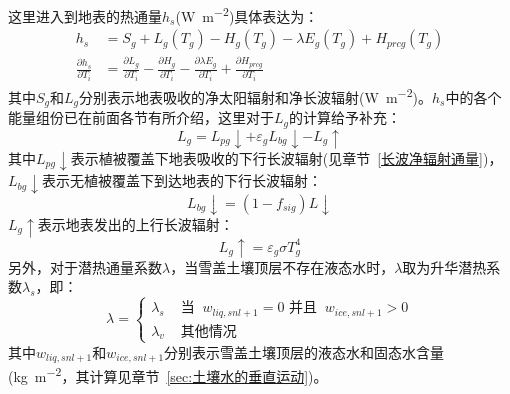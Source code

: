 这里进入到地表的热通量$h_s$(\unit{W.m^{-2}})具体表达为：
\begin{equation}
\begin{aligned}
h_{s} &= S_{g}+L_{g}\left(T_{g}\right)-H_{g}\left(T_{g}\right)-\lambda E_{g}\left(T_{g}\right)+H_{p r c g}\left(T_{g}\right) \\
\frac{\partial h_{s}}{\partial T_{i}} &= \frac{\partial L_{g}}{\partial T_{i}}-\frac{\partial H_{g}}{\partial T_{i}}-\frac{\partial \lambda E_{g}}{\partial T_{i}}+\frac{\partial H_{p r c g}}{\partial T_{i}}
\end{aligned}
\end{equation}
其中$S_g$和$L_g$分别表示地表吸收的净太阳辐射和净长波辐射(\unit{W.m^{-2}})。$h_s$中的各个能量组份已在前面各节有所介绍，这里对于$L_g$的计算给予补充：
\begin{equation}
L_{g}=L_{p g} \downarrow+\varepsilon_{g} L_{b g} \downarrow-L_{g} \uparrow
\end{equation}
其中$L_{pg}\downarrow$表示植被覆盖下地表吸收的下行长波辐射(见章节~\ref{长波净辐射通量})，$L_{bg}\downarrow$表示无植被覆盖下到达地表的下行长波辐射：
\begin{equation}
L_{b g} \downarrow=\left(1-f_{ sig }\right) L \downarrow
\end{equation}
$L_g\uparrow$表示地表发出的上行长波辐射：
\begin{equation}
L_{g} \uparrow=\varepsilon_{g} \sigma T_{g}^{4}
\end{equation}
另外，对于潜热通量系数$\lambda$，当雪盖土壤顶层不存在液态水时，$\lambda$取为升华潜热系数$\lambda_s$，即：
\begin{equation}
\lambda=\left\{\begin{array}{lr}\lambda_{s} & \text { 当 }\ w_{liq, s n l+1}=0 \text { 并且 }\ w_{ice, s n l+1}>0 \\ \lambda_{v} & \text { 其他情况 }\end{array}\right.
\end{equation}
其中$w_{liq,snl+1}$和$w_{ice,snl+1}$分别表示雪盖土壤顶层的液态水和固态水含量 (\unit{kg.m^{-2}}，其计算见章节~\ref{sec:土壤水的垂直运动})。


